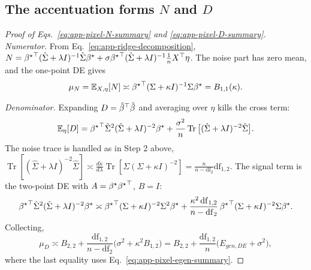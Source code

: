 \subsection{The accentuation forms $N$ and $D$}

\begin{proof}[Proof of Eqs.~\ref{eq:app-pixel-N-summary} and \ref{eq:app-pixel-D-summary}]
\emph{Numerator.}  From Eq.~\ref{eq:app-ridge-decomposition},
$N={{\beta^{\star}}}^\top(\hat\Sigma+\lambda I)^{-1}\hat\Sigma{\beta^{\star}}
+\sigma{{\beta^{\star}}}^\top(\hat\Sigma+\lambda I)^{-1}\frac1nX^\top\eta$.  The noise
part has zero mean, and the one-point DE gives
\begin{equation}
\mu_N=\mathbb{E}_{X,\eta}[N]\asymp{{\beta^{\star}}}^\top(\Sigma+\kappa I)^{-1}\Sigma{\beta^{\star}}=B_{1,1}(\kappa).
\label{eq:mean_numerator_dotprod}
\end{equation}

\emph{Denominator.}  Expanding $D={\hat{\beta}}^\top\hat{\beta}$ and averaging over
$\eta$ kills the cross term:
\[
\mathbb{E}_\eta[D]={{\beta^{\star}}}^\top\hat\Sigma^2(\hat\Sigma+\lambda I)^{-2}{\beta^{\star}}
+\frac{\sigma^2}{n}\operatorname{Tr}\big[(\hat\Sigma+\lambda I)^{-2}\hat\Sigma\big].
\]
The noise trace is handled as in Step 2 above,
$\operatorname{Tr}[(\hat\Sigma+\lambda I)^{-2}\hat\Sigma]\asymp
\frac{d\kappa}{d\lambda}\operatorname{Tr}[\Sigma(\Sigma+\kappa I)^{-2}]
=\frac{n}{n-\mathrm{df}_2}\mathrm{df}_{1,2}$.  The signal term is the
two-point DE with $A={\beta^{\star}}{{\beta^{\star}}}^\top$, $B=I$:
\[
{{\beta^{\star}}}^\top\hat\Sigma^2(\hat\Sigma+\lambda I)^{-2}{\beta^{\star}}
\asymp{{\beta^{\star}}}^\top(\Sigma+\kappa I)^{-2}\Sigma^2{\beta^{\star}}
+\frac{\kappa^2\,\mathrm{df}_{1,2}}{n-\mathrm{df}_2}\,{{\beta^{\star}}}^\top(\Sigma+\kappa I)^{-2}\Sigma{\beta^{\star}} .
\]
Collecting,
\begin{equation}
\mu_D\asymp B_{2,2}+\frac{\mathrm{df}_{1,2}}{n-\mathrm{df}_2}\big(\sigma^2+\kappa^2B_{1,2}\big)
=B_{2,2}+\frac{\mathrm{df}_{1,2}}{n}\big(E_{gen,DE}+\sigma^2\big),
\label{eq:mean_denom_sqnorm}
\end{equation}
where the last equality uses Eq.~\ref{eq:app-pixel-egen-summary}.
\end{proof}

